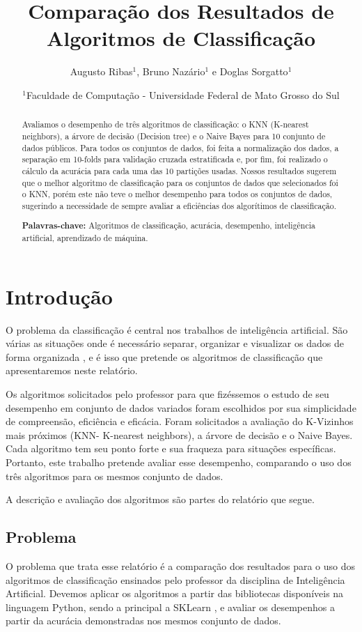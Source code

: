 \documentclass[12pt, a4paper]{article}
\title{Comparação dos Resultados de Algoritmos de Classificação}
\author{Augusto Ribas$^1$, Bruno Nazário$^1$ e Doglas Sorgatto$^1$}
\date{$^1$Faculdade de Computação - Universidade Federal de Mato Grosso do Sul}
\begin{document}
\maketitle

\begin{abstract}
Avaliamos o desempenho de três algoritmos de classificação: o KNN (K-nearest neighbors), a árvore de decisão (Decision tree) e o Naive Bayes para 10 conjunto de dados públicos. Para todos os conjuntos de dados, foi feita a normalização dos dados, a separação em 10-folds para validação cruzada estratificada e, por fim, foi realizado o cálculo da acurácia para cada uma das 10 partições usadas. Nossos resultados sugerem que o melhor algoritmo de classificação para os conjuntos de dados que selecionados foi o KNN, porém este não teve o melhor desempenho para todos os conjuntos de dados, sugerindo a necessidade de sempre avaliar a eficiências dos algorítimos de classificação.

\textbf{Palavras-chave:} Algoritmos de classificação, acurácia, desempenho, inteligência artificial, aprendizado de máquina.
\end{abstract}
%
\section{Introdução}
O problema da classificação é central nos trabalhos de inteligência artificial. São várias as situações onde é necessário separar, organizar e visualizar os dados de forma organizada \citep{Mitchell1997}, e é isso que pretende os algoritmos de classificação que apresentaremos neste relatório.

Os algoritmos solicitados pelo professor para que fizéssemos o estudo de seu desempenho em conjunto de dados variados foram escolhidos por sua simplicidade de compreensão, eficiência e eficácia. Foram solicitados a avaliação do K-Vizinhos mais próximos (KNN- K-nearest neighbors), a árvore de decisão e o Naive Bayes. Cada algoritmo tem seu ponto forte e sua fraqueza para situações específicas. Portanto, este trabalho pretende avaliar esse desempenho, comparando o uso dos três algoritmos para os mesmos conjunto de dados.

A descrição e avaliação dos algoritmos são partes do relatório que segue.


\subsection{Problema}
O problema que trata esse relatório é a comparação dos resultados para o uso dos algoritmos de classificação ensinados pelo professor da disciplina de Inteligência Artificial. Devemos aplicar os algoritmos a partir das bibliotecas disponíveis na linguagem Python, sendo a principal a SKLearn \cite{scikit-learn}, e avaliar os desempenhos a partir da acurácia demonstradas nos mesmos conjunto de dados.
\end{document}
